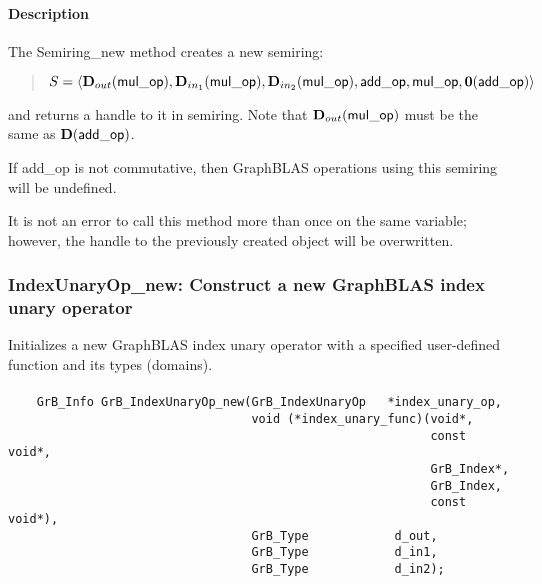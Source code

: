 \paragraph{Description}

The {\sf Semiring\_new} method creates a new semiring:
\begin{quote}
$S = \langle \mbox{$\mathbf{D}_{out}$}({\sf mul\_op}), 
\mbox{$\mathbf{D}_{in_{1}}$}({\sf mul\_op}), \mbox{$\mathbf{D}_{in_{2}}$}({\sf mul\_op}), {\sf add\_op}, 
{\sf mul\_op}, \mathbf{0}({\sf add\_op})\rangle$
\end{quote}
and returns a handle to it in 
{\sf semiring}.  Note that $\mbox{$\mathbf{D}_{out}$}({\sf mul\_op})$ must be the same as 
$\mathbf{D}({\sf add\_op})$.

If {\sf add\_op} is not commutative, then GraphBLAS operations using this semiring
will be undefined.

It is not an error to call this method more than once on the same variable;  
however, the handle to the previously created object will be overwritten. 


\subsubsection{{\sf IndexUnaryOp\_new}: Construct a new GraphBLAS index unary operator }

Initializes a new GraphBLAS index unary operator with a specified user-defined 
function and its types (domains).

\paragraph{\syntax}

\begin{verbatim}
    GrB_Info GrB_IndexUnaryOp_new(GrB_IndexUnaryOp   *index_unary_op,
                                  void (*index_unary_func)(void*,
                                                           const void*,
                                                           GrB_Index*,
                                                           GrB_Index,
                                                           const void*),
                                  GrB_Type            d_out,
                                  GrB_Type            d_in1,
                                  GrB_Type            d_in2);
\end{verbatim}


